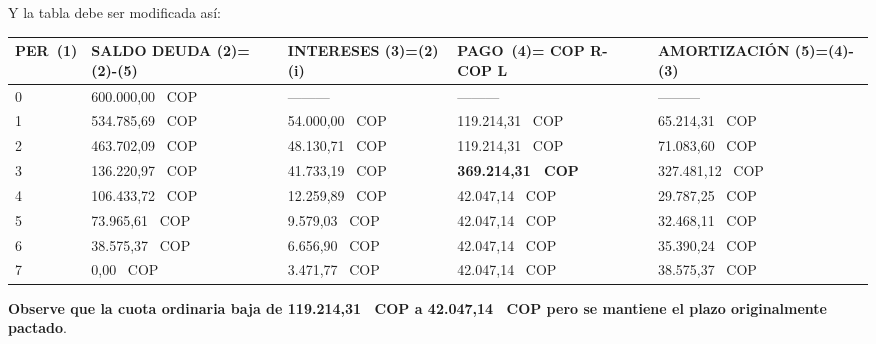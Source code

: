 
Y la tabla debe ser modificada así:

\begin{spacing}{1.1}
    \footnotesize
	\begin{center}
		\begin{tabular}{|p{1cm}|p{2cm}|p{2cm}|p{2cm}|p{3cm}|}
			\hline
			\textbf{PER\ (1)} & \textbf{SALDO DEUDA (2)=(2)-(5)} & \textbf{INTERESES  (3)=(2)(i)} & \textbf{PAGO\ (4)= COP  R- COP  L } & \textbf{AMORTIZACIÓN  (5)=(4)-(3)} \\ \hline
			
			0                 &  600.000,00 \ COP                     & ---------                       & ---------                   & ---------                          \\ \hline
			1                 &  534.785,69 \ COP                     &  54.000,00 \ COP                    &  119.214,31 \ COP                &  65.214,31 \ COP                        \\ \hline
			2                 &  463.702,09 \ COP                     &  48.130,71 \ COP                    &  119.214,31 \ COP                &  71.083,60 \ COP                        \\ \hline
    3                 &  136.220,97 \ COP                     &  41.733,19 \ COP                     &  \textbf{369.214,31 \ COP }                 &  327.481,12 \ COP                       \\ \hline
			4                 &  106.433,72 \ COP                     &  12.259,89 \ COP                     &  42.047,14 \ COP                 &  29.787,25 \ COP                        \\ \hline
			5                 &  73.965,61 \ COP                      &  9.579,03 \ COP                      &  42.047,14 \ COP                 &  32.468,11 \ COP                        \\ \hline
			6                 &  38.575,37 \ COP                      &  6.656,90 \ COP                      &  42.047,14 \ COP                 &  35.390,24 \ COP                        \\ \hline
			7                 &  0,00 \ COP                           &  3.471,77 \ COP                      &  42.047,14 \ COP                 &  38.575,37 \ COP                        \\ \hline
		\end{tabular}
	\end{center}
\end{spacing}

\textbf{Observe que la cuota ordinaria baja de  119.214,31 \ COP a  42.047,14 \ COP pero se mantiene el plazo originalmente pactado}.\\
